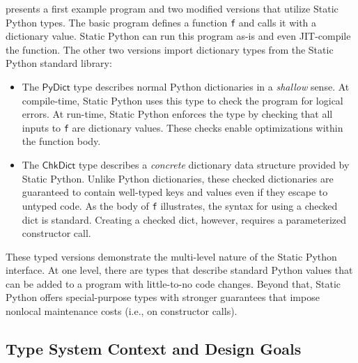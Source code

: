 \documentclass[english,cleveref,submission]{programming}
\newcommand{\SP}{Static Python}
\newcommand{\code}[1]{\texttt{#1}}
\newcommand{\typefont}[1]{\mathsf{#1}}
\newcommand{\sptrawpydict}{\typefont{PyDict}}
\newcommand{\sptrawchkdict}{\typefont{ChkDict}} %
\begin{document}
 presents a first example program and two modified versions that
utilize \SP{} types.
The basic program defines a function \code{f} and calls it with a dictionary
value.
\SP{} can run this program as-is and even JIT-compile the function.
The other two versions import dictionary types from the \SP{} standard library:
\begin{itemize}
  \item
    The $\sptrawpydict$ type describes normal Python dictionaries in a \emph{shallow} sense.
    At compile-time, \SP{} uses this type to check the program for logical errors.
    At run-time, \SP{} enforces the type by checking that all inputs to \code{f} are
    dictionary values.
    These checks enable optimizations within the function body.

  \item
    The $\sptrawchkdict$ type describes a \emph{concrete} dictionary data structure provided by \SP{}.
    Unlike Python dictionaries, these checked dictionaries are guaranteed to
    contain well-typed keys and values even if they escape to untyped code.
    As the body of \code{f} illustrates, the syntax for using a checked dict is standard.
    Creating a checked dict, however, requires a parameterized constructor call.
\end{itemize}
These typed versions demonstrate the multi-level nature of the \SP{} interface.
At one level, there are types that describe standard Python values that can be added
to a program with little-to-no code changes.
Beyond that, \SP{} offers special-purpose types with stronger guarantees that impose
nonlocal maintenance costs (i.e., on constructor calls).


\subsection{Type System Context and Design Goals}
\end{document}
